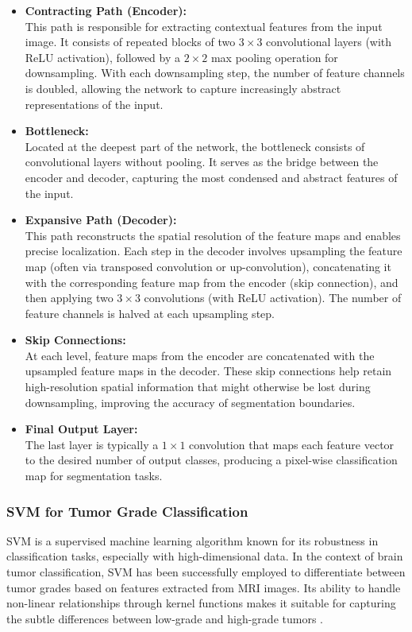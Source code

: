 \begin{itemize}
  \item \textbf{Contracting Path (Encoder):} \\
        This path is responsible for extracting contextual features from the input image. It consists of repeated blocks of two $3\times3$ convolutional layers (with ReLU activation), followed by a $2\times2$ max pooling operation for downsampling. With each downsampling step, the number of feature channels is doubled, allowing the network to capture increasingly abstract representations of the input.

  \item \textbf{Bottleneck:} \\
        Located at the deepest part of the network, the bottleneck consists of convolutional layers without pooling. It serves as the bridge between the encoder and decoder, capturing the most condensed and abstract features of the input.

  \item \textbf{Expansive Path (Decoder):} \\
        This path reconstructs the spatial resolution of the feature maps and enables precise localization. Each step in the decoder involves upsampling the feature map (often via transposed convolution or up-convolution), concatenating it with the corresponding feature map from the encoder (skip connection), and then applying two $3\times3$ convolutions (with ReLU activation). The number of feature channels is halved at each upsampling step.

  \item \textbf{Skip Connections:} \\
        At each level, feature maps from the encoder are concatenated with the upsampled feature maps in the decoder. These skip connections help retain high-resolution spatial information that might otherwise be lost during downsampling, improving the accuracy of segmentation boundaries.

  \item \textbf{Final Output Layer:} \\
        The last layer is typically a $1\times1$ convolution that maps each feature vector to the desired number of output classes, producing a pixel-wise classification map for segmentation tasks.
\end{itemize}

\subsubsection{SVM for Tumor Grade Classification}
SVM is a supervised machine learning algorithm known for its robustness in classification tasks, especially with high-dimensional data. In the context of brain tumor classification, SVM has been successfully employed to differentiate between tumor grades based on features extracted from MRI images. Its ability to handle non-linear relationships through kernel functions makes it suitable for capturing the subtle differences between low-grade and high-grade tumors \cite{turk2022machine, barker2016automated}.

